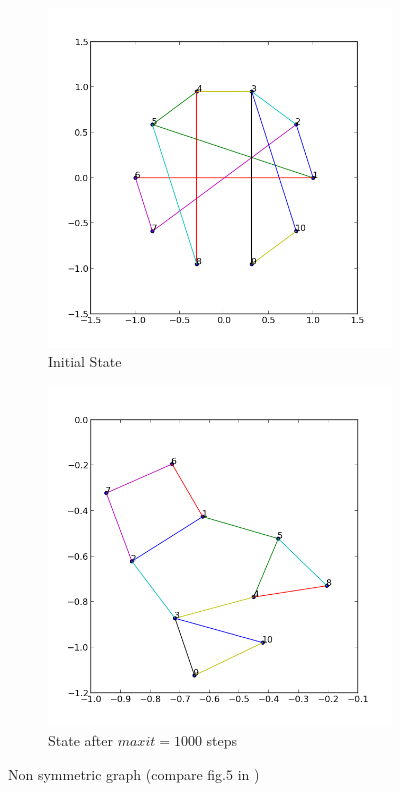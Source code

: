 \documentclass[12pt,a4paper]{article}
\begin{document}
\begin{figure}[htb]
	 \begin{subfigure}{0.5\textwidth}
		   \centering
           \includegraphics[scale=0.4]{results_Kawai/ex3_before}
           \caption{Initial State}
     \end{subfigure}
	 \begin{subfigure}{0.5\textwidth}
			\centering
           \includegraphics[scale=0.4]{results_Kawai/ex3_after}
            \caption{State after $maxit=1000$ steps}
     \end{subfigure}
     \caption{Non symmetric graph (compare fig.$5$ in \cite{TomihisaKamada1989})}
     \label{fig: nonsym}
\end{figure}    
\end{document}
